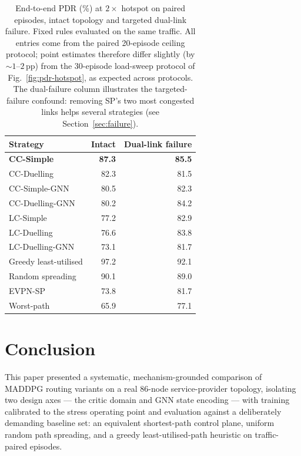 \documentclass[10pt,journal,comsoc]{IEEEtran}
\begin{document}
\begin{table}[!t]
  \centering
  \caption{End-to-end PDR (\%) at $2\times$ hotspot on paired episodes, intact topology and targeted dual-link failure. Fixed rules evaluated on the same traffic. All entries come from the paired 20-episode ceiling protocol; point estimates therefore differ slightly (by ${\sim}1$--$2$\,pp) from the 30-episode load-sweep protocol of Fig.~\ref{fig:pdr-hotspot}, as expected across protocols. The dual-failure column illustrates the targeted-failure confound: removing SP's two most congested links helps several strategies (see Section~\ref{sec:failure}).}
  \label{tab:master}
  \small
  \begin{tabular}{lrr}
    \toprule
    Strategy & Intact & Dual-link failure \\
    \midrule
    \textbf{CC-Simple} & \textbf{87.3} & \textbf{85.5} \\
    CC-Duelling      & 82.3 & 81.5 \\
    CC-Simple-GNN    & 80.5 & 82.3 \\
    CC-Duelling-GNN  & 80.2 & 84.2 \\
    LC-Simple        & 77.2 & 82.9 \\
    LC-Duelling      & 76.6 & 83.8 \\
    LC-Duelling-GNN  & 73.1 & 81.7 \\
    \midrule
    Greedy least-utilised & 97.2 & 92.1 \\
    Random spreading & 90.1 & 89.0 \\
    EVPN-SP          & 73.8 & 81.7 \\
    Worst-path       & 65.9 & 77.1 \\
    \bottomrule
  \end{tabular}
\end{table}

\section{Conclusion}\label{conclusion}
This paper presented a systematic, mechanism-grounded comparison of MADDPG routing variants on a real 86-node service-provider topology, isolating two design axes --- the critic domain and GNN state encoding --- with training calibrated to the stress operating point and evaluation against a deliberately demanding baseline set: an equivalent shortest-path control plane, uniform random path spreading, and a greedy least-utilised-path heuristic on traffic-paired episodes.
\end{document}
